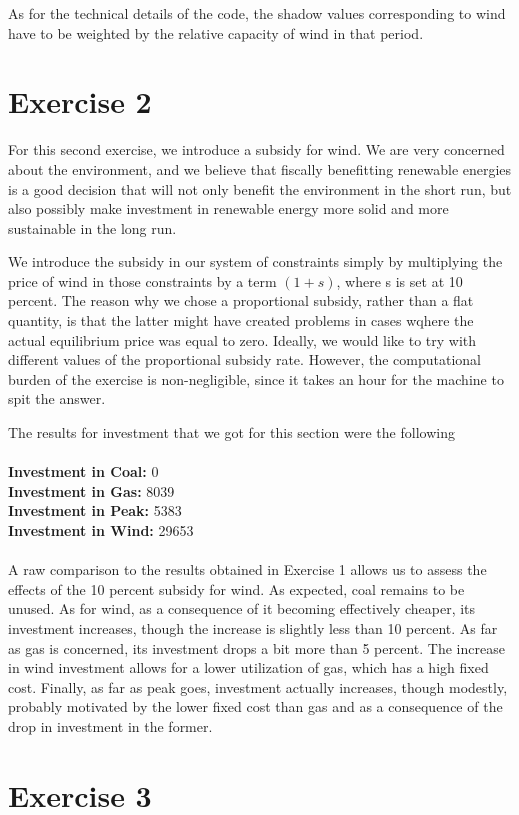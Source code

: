 \documentclass[12 pt]{article}
\begin{document}
As for the technical details of the code, the shadow values corresponding to wind have to be weighted by the relative capacity of wind in that period. 

\section*{Exercise 2}

For this second exercise, we introduce a subsidy for wind. We are very concerned about the environment, and we believe that fiscally benefitting renewable energies is a good decision that will not only benefit the environment in the short run, but also possibly make investment in renewable energy more solid and more sustainable in the long run.

We introduce the subsidy in our system of constraints simply by multiplying the price of wind in those constraints by a term $(1+s)$, where s is set at 10 percent. The reason why we chose a proportional subsidy, rather than a flat quantity, is that the latter might have created problems in cases wqhere the actual equilibrium price was equal to zero. Ideally, we would like to try with different values of the proportional subsidy rate. However, the computational burden of the exercise is non-negligible, since it takes an hour for the machine to spit the answer. 

The results for investment that we got for this section were the following \\
\\
\textbf{Investment in Coal:} 0 \\
\textbf{Investment in Gas:}  8039  \\
\textbf{Investment in Peak:} 5383 \\
\textbf{Investment in Wind:} 29653 \\
\\

A raw comparison to the results obtained in Exercise 1 allows us to assess the effects of the 10 percent subsidy for wind. As expected, coal remains to be unused. As for wind, as a consequence of it becoming effectively cheaper, its investment increases, though the increase is slightly less than 10 percent. As far as gas is concerned, its investment drops a bit more than 5 percent. The increase in wind investment allows for a lower utilization of gas, which has a high fixed cost. Finally, as far as peak goes, investment actually increases, though modestly, probably motivated by the lower fixed cost than gas and as a consequence of the drop in investment in the former.

\section*{Exercise 3}
\end{document}
